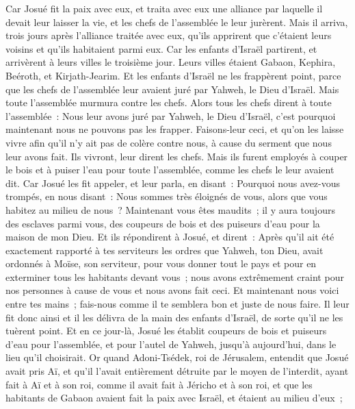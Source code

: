 \begin{multicols}{2}
Car Josué fit la paix avec eux, et traita avec eux une alliance par laquelle il devait leur laisser la vie, et les chefs de l'assemblée le leur jurèrent.
Mais il arriva, trois jours après l'alliance traitée avec eux, qu'ils apprirent que c'étaient leurs voisins et qu'ils habitaient parmi eux.
Car les enfants d'Israël partirent, et arrivèrent à leurs villes le troisième jour. Leurs villes étaient Gabaon, Kephira, Beéroth, et Kirjath-Jearim.
Et les enfants d'Israël ne les frappèrent point, parce que les chefs de l'assemblée leur avaient juré par Yahweh, le Dieu d'Israël. Mais toute l'assemblée murmura contre les chefs.
Alors tous les chefs dirent à toute l'assemblée~: Nous leur avons juré par Yahweh, le Dieu d'Israël, c'est pourquoi maintenant nous ne pouvons pas les frapper.
Faisons-leur ceci, et qu'on les laisse vivre afin qu'il n'y ait pas de colère contre nous, à cause du serment que nous leur avons fait.
Ils vivront, leur dirent les chefs. Mais ils furent employés à couper le bois et à puiser l'eau pour toute l'assemblée, comme les chefs le leur avaient dit.
Car Josué les fit appeler, et leur parla, en disant~: Pourquoi nous avez-vous trompés, en nous disant~: Nous sommes très éloignés de vous, alors que vous habitez au milieu de nous~?
Maintenant vous êtes maudits~; il y aura toujours des esclaves parmi vous, des coupeurs de bois et des puiseurs d'eau pour la maison de mon Dieu.
Et ils répondirent à Josué, et dirent~: Après qu'il ait été exactement rapporté à tes serviteurs les ordres que Yahweh, ton Dieu, avait ordonnés à Moïse, son serviteur, pour vous donner tout le pays et pour en exterminer tous les habitants devant vous~; nous avons extrêmement craint pour nos personnes à cause de vous et nous avons fait ceci.
Et maintenant nous voici entre tes mains~; fais-nous comme il te semblera bon et juste de nous faire.
Il leur fit donc ainsi et il les délivra de la main des enfants d'Israël, de sorte qu'il ne les tuèrent point.
Et en ce jour-là, Josué les établit coupeurs de bois et puiseurs d'eau pour l'assemblée, et pour l'autel de Yahweh, jusqu'à aujourd'hui, dans le lieu qu'il choisirait.
\VerseOne{}Or quand Adoni-Tsédek, roi de Jérusalem, entendit que Josué avait pris Aï, et qu'il l'avait entièrement détruite par le moyen de l'interdit, ayant fait à Aï et à son roi, comme il avait fait à Jéricho et à son roi, et que les habitants de Gabaon avaient fait la paix avec Israël, et étaient au milieu d'eux~;

\end{multicols}
